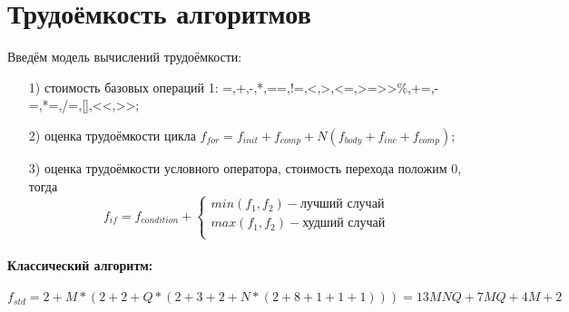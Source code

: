 \section{Трудоёмкость алгоритмов}
\label{sec:labour}
Введём модель вычислений трудоёмкости:
\begin{enumerate}
	\item[1)] стоимость базовых операций 1: =,+,-,*,==,!=,<,>,<=,>=>>\%,+=,-=,*=,/=,[],<<,>>;
	\item[2)] оценка трудоёмкости цикла $f_{for}=f_{init}+f_{comp}+N(f_{body}+f_{inc}+f_{comp})$;
	\item[3)] оценка трудоёмкости условного оператора, стоимость перехода положим 0, тогда
	\begin{equation}
		f_{if}=f_{condition}+\begin{cases}
		min(f_{1},f_{2})-\text{лучший случай}\\
		max(f_{1},f_{2})-\text{худший случай}\\
		\end{cases}
	\end{equation} 
\end{enumerate}

\paragraph{Классический алгоритм:}
\begin{equation}
	f_{std}=2+M*(2+2+Q*(2+3+2+N*(2+8+1+1+1)))=13MNQ+7MQ+4M+2
\end{equation}

